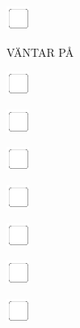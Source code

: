 \documentclass[11pt,titlepage]{article}
\begin{document}
\vspace{10mm}

\noindent
\includegraphics[]{checkbox-4mm.pdf}

\pagebreak

\small %
\hfill VÄNTAR PÅ

\vspace{6mm}

\noindent
\includegraphics[]{checkbox-4mm.pdf}

\vspace{10mm}

\noindent
\includegraphics[]{checkbox-4mm.pdf}

\vspace{10mm}

\noindent
\includegraphics[]{checkbox-4mm.pdf}

\vspace{10mm}

\noindent
\includegraphics[]{checkbox-4mm.pdf}

\vspace{10mm}

\noindent
\includegraphics[]{checkbox-4mm.pdf}

\vspace{10mm}

\noindent
\includegraphics[]{checkbox-4mm.pdf}

\vspace{10mm}

\noindent
\includegraphics[]{checkbox-4mm.pdf}
\end{document}
